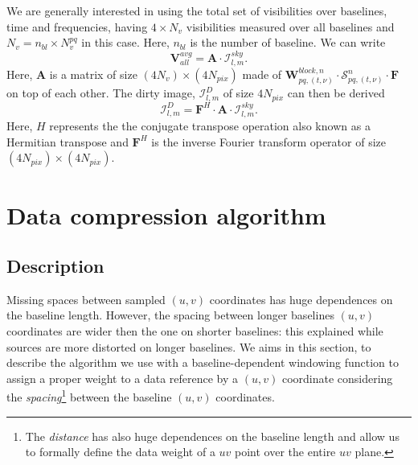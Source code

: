 \documentclass[useAMS,usenatbib]{mn2e}
\begin{document}
We are generally interested in using the total set of visibilities over baselines, time and frequencies, having $4\times N_v$ visibilities 
measured over all baselines  and $N_v=n_{bl}\times N_v^{pq}$ in this case. Here, $n_{bl}$ is the number of baseline. We can write
\begin{equation}
 \mathbf{V}_{all}^{avg}=\mathbf{A}\cdot\mathcal{I}_{l,m}^{sky}.
\end{equation}
Here, $\mathbf{A}$ is a matrix of size $(4N_v)\times (4N_{pix})$ made of 
$\mathbf{W}_{pq,(t,\nu)}^{block,n}\cdot\mathcal{S}_{pq,(t,\nu)}^{n}\cdot\mathbf{F}$ on top of each other. The 
dirty image, $\mathcal{I}_{l,m}^{D}$ of size $4N_{pix}$ can then be derived
\begin{equation}
\mathcal{I}_{l,m}^{D}=\mathbf{F}^{H}\cdot\mathbf{A}\cdot\mathcal{I}_{l,m}^{sky}.
\end{equation}
Here, $H$ represents the the conjugate transpose operation also known as a Hermitian transpose and $\mathbf{F}^{H}$ is the inverse 
Fourier transform operator of size $(4N_{pix})\times(4N_{pix})$.
\section{Data compression algorithm}
\label{baseline1}
\subsection{Description}
Missing spaces between sampled $(u,v)$ coordinates has huge dependences on the baseline length. However, the spacing between longer 
baselines $(u,v)$ coordinates are wider then the one on shorter baselines: this explained while sources are more distorted on longer 
baselines. We aims in this section, to describe the algorithm we use with a baseline-dependent windowing function to assign a proper 
weight to a data reference by a $(u,v)$ coordinate considering the \textit{spacing}\footnote{The \textit{distance} has also huge 
dependences on the baseline length and allow us to formally define the data
weight of a $uv$ point over the entire $uv$ plane.} between the baseline $(u,v)$ coordinates.
\end{document}
